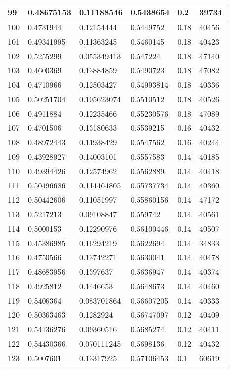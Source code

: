 \begin{longtable}{|l|l|l|l|l|l|}
99 & 0.48675153 & 0.11188546 & 0.5438654 & 0.2 & 39734 \\ \hline 
100 & 0.4731944 & 0.12154444 & 0.5449752 & 0.18 & 40456 \\ \hline 
101 & 0.49341995 & 0.11363245 & 0.5460145 & 0.18 & 40423 \\ \hline 
102 & 0.5255299 & 0.055349413 & 0.547224 & 0.18 & 47140 \\ \hline 
103 & 0.4600369 & 0.13884859 & 0.5490723 & 0.18 & 47082 \\ \hline 
104 & 0.4710966 & 0.12503427 & 0.54993814 & 0.18 & 40336 \\ \hline 
105 & 0.50251704 & 0.105623074 & 0.5510512 & 0.18 & 40526 \\ \hline 
106 & 0.4911884 & 0.12235466 & 0.55230576 & 0.18 & 47089 \\ \hline 
107 & 0.4701506 & 0.13180633 & 0.5539215 & 0.16 & 40432 \\ \hline 
108 & 0.48972443 & 0.11938429 & 0.5547562 & 0.16 & 40244 \\ \hline 
109 & 0.43928927 & 0.14003101 & 0.5557583 & 0.14 & 40185 \\ \hline 
110 & 0.49394426 & 0.12574962 & 0.5562889 & 0.14 & 40418 \\ \hline 
111 & 0.50496686 & 0.114464805 & 0.55737734 & 0.14 & 40360 \\ \hline 
112 & 0.50442606 & 0.11051997 & 0.55860156 & 0.14 & 47172 \\ \hline 
113 & 0.5217213 & 0.09108847 & 0.559742 & 0.14 & 40561 \\ \hline 
114 & 0.5000153 & 0.12290976 & 0.56100446 & 0.14 & 40507 \\ \hline 
115 & 0.45386985 & 0.16294219 & 0.5622694 & 0.14 & 34833 \\ \hline 
116 & 0.4750566 & 0.13742271 & 0.5630041 & 0.14 & 40478 \\ \hline 
117 & 0.48683956 & 0.1397637 & 0.5636947 & 0.14 & 40374 \\ \hline 
118 & 0.4925812 & 0.1446653 & 0.5648673 & 0.14 & 40460 \\ \hline 
119 & 0.5406364 & 0.083701864 & 0.56607205 & 0.14 & 40333 \\ \hline 
120 & 0.50363463 & 0.1282924 & 0.56747097 & 0.12 & 40409 \\ \hline 
121 & 0.54136276 & 0.09360516 & 0.5685274 & 0.12 & 40411 \\ \hline 
122 & 0.54430366 & 0.070111245 & 0.5698136 & 0.12 & 40432 \\ \hline 
123 & 0.5007601 & 0.13317925 & 0.57106453 & 0.1 & 60619 \\ \hline 

\end{longtable}
